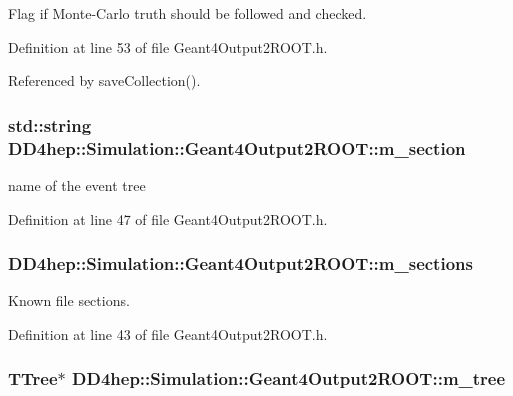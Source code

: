 Flag if Monte-\/Carlo truth should be followed and checked. 

Definition at line 53 of file Geant4Output2ROOT.h.

Referenced by saveCollection().\hypertarget{class_d_d4hep_1_1_simulation_1_1_geant4_output2_r_o_o_t_a27d44319d71af2cbb9304f94fce6a075}{
\subsubsection[{m\_\-section}]{\setlength{\rightskip}{0pt plus 5cm}std::string {\bf DD4hep::Simulation::Geant4Output2ROOT::m\_\-section}}}
\label{class_d_d4hep_1_1_simulation_1_1_geant4_output2_r_o_o_t_a27d44319d71af2cbb9304f94fce6a075}


name of the event tree 

Definition at line 47 of file Geant4Output2ROOT.h.\hypertarget{class_d_d4hep_1_1_simulation_1_1_geant4_output2_r_o_o_t_a43291c7d4f16e1f7eda8da9a16d6c4fa}{
\subsubsection[{m\_\-sections}]{ {\bf DD4hep::Simulation::Geant4Output2ROOT::m\_\-sections}}}
\label{class_d_d4hep_1_1_simulation_1_1_geant4_output2_r_o_o_t_a43291c7d4f16e1f7eda8da9a16d6c4fa}


Known file sections. 

Definition at line 43 of file Geant4Output2ROOT.h.\hypertarget{class_d_d4hep_1_1_simulation_1_1_geant4_output2_r_o_o_t_abebdae30096c1b1a5ff1f7da427db295}{
\subsubsection[{m\_\-tree}]{\setlength{\rightskip}{0pt plus 5cm}TTree$\ast$ {\bf DD4hep::Simulation::Geant4Output2ROOT::m\_\-tree}}}
\label{class_d_d4hep_1_1_simulation_1_1_geant4_output2_r_o_o_t_abebdae30096c1b1a5ff1f7da427db295}


